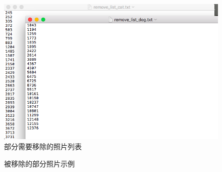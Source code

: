 \documentclass[a4paper,11pt]{article}
\begin{document}
\begin{figure}[htb]
\centering
\includegraphics[scale=0.55]{./figure/removelist.png}
\caption{部分需要移除的照片列表}
\label{fig:remove}
\end{figure}

\begin{figure}[htb]
\centering
{}
\caption{被移除的部分照片示例}
\label{fig:missfigure}
\end{figure}
\end{document}

